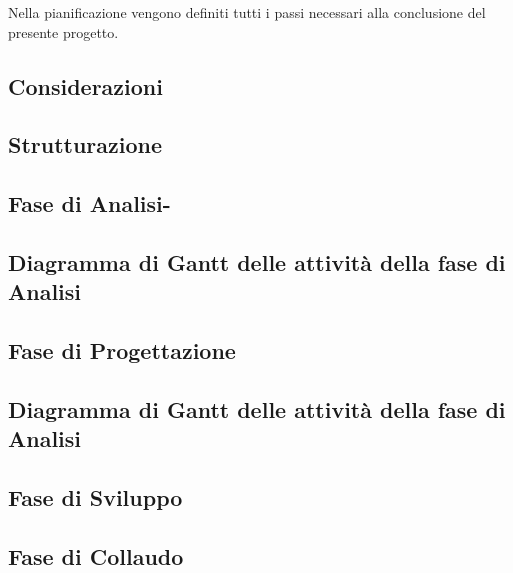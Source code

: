 Nella pianificazione vengono definiti tutti i passi necessari alla conclusione del presente progetto.

\subsection{Considerazioni}\label{sec:Considerazioni}


\subsection{Strutturazione}\label{sec:Strutturazione}


\subsection{Fase di Analisi- }\label{sec:Periodo 1 Analisi}

\subsection{Diagramma di Gantt delle attività della fase di Analisi}\label{sec:Gant Analisi}


\subsection{Fase di Progettazione}\label{Progettazione}

\subsection{Diagramma di Gantt delle attività della fase di Analisi}\label{sec:Gant Analisi}

    
\subsection{Fase di Sviluppo}\label{sec:Sviluppo}

    
\subsection{Fase di Collaudo}\label{sec:Collaudo}
